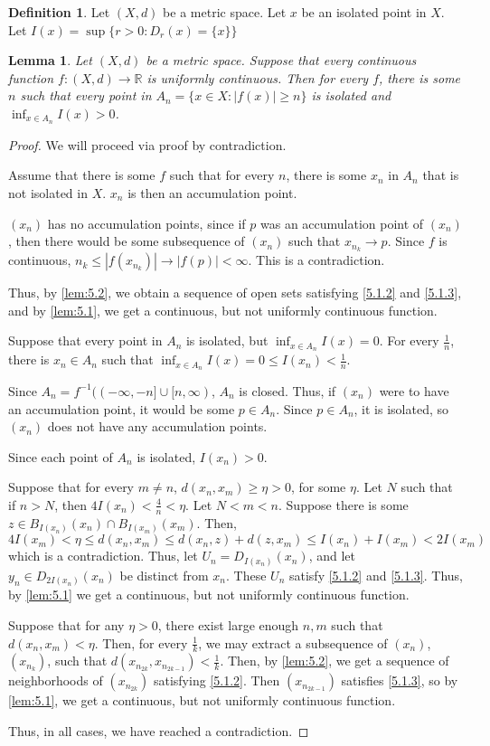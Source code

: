 \documentclass[openany, amssymb, psamsfonts]{amsart}
\let\fullref\autoref
\newtheorem{lem}{Lemma}[section]
\theoremstyle{definition}
\newtheorem{defn}{Definition}[section]
\numberwithin{equation}{section}
\begin{document}
\begin{defn}
  Let $(X,d)$ be a metric space. Let $x$ be an isolated point in $X$. Let $I(x) = \sup \{ r > 0 : D_r(x) = \{x\}\}$
\end{defn}
\begin{lem}\label{lem:5.3}
  Let $(X,d)$ be a metric space. Suppose that every continuous function $f:(X,d) \to \mathbb R$ is uniformly continuous. Then for every $f$, there is some $n$ such that every point in $A_n = \{x \in X : |f(x)| \ge n\}$ is isolated and $\inf_{x\in A_n} I(x) > 0$. 
\end{lem}
\begin{proof}
We will proceed via proof by contradiction.

Assume that there is some $f$ such that for every $n$, there is some $x_n$ in $A_n$ that is not isolated in $X$. $x_n$ is then an accumulation point. 

$(x_n)$ has no accumulation points, since if $p$ was an accumulation point of $(x_n)$, then there would be some subsequence of $(x_n)$ such that $x_{n_k} \to p$. Since $f$ is continuous, $n_k \le |f(x_{n_k})| \to |f(p)| < \infty$. This is a contradiction. 

Thus, by \fullref{lem:5.2}, we obtain a sequence of open sets satisfying \ref{5.1.2} and \ref{5.1.3}, and by \fullref{lem:5.1}, we get a continuous, but not uniformly continuous function.

Suppose that every point in $A_n$ is isolated, but $\inf_{x\in A_n} I(x) = 0$. For every $\frac1{n}$, there is $x_n \in A_n$ such that $\inf_{x\in A_n} I(x) = 0 \le I(x_n) < \frac1{n}$. 

Since $A_n = f^{-1}((-\infty, -n] \cup [n, \infty)$, $A_n$ is closed. Thus, if $(x_n)$ were to have an accumulation point, it would be some $p \in A_n$. Since $p\in A_n$, it is isolated, so $(x_n)$ does not have any accumulation points. 

Since each point of $A_n$ is isolated, $I(x_n) > 0$. 

Suppose that for every $m\neq n$, $d(x_n, x_m) \ge \eta > 0$, for some $\eta$. Let $N$ such that if $n > N$, then $4 I(x_n) < \frac4{n} < \eta$. Let $N < m < n$. Suppose there is some $z \in B_{I(x_n)}(x_n) \cap B_{I(x_m)}(x_m)$. Then,
\[
  4I(x_m) < \eta \le d(x_n, x_m) \le d(x_n, z) + d(z, x_m) \le I(x_n) + I(x_m) < 2I(x_m)
\]
which is a contradiction. Thus, let $U_n = D_{I(x_n)}(x_n)$, and let $y_n \in D_{2I(x_n)}(x_n)$ be distinct from $x_n$. These $U_n$ satisfy \ref{5.1.2} and \ref{5.1.3}. Thus, by \fullref{lem:5.1} we get a continuous, but not uniformly continuous function.

Suppose that for any $\eta > 0$, there exist large enough $n,m$ such that $d(x_n, x_m) < \eta$. Then, for every $\frac1{k}$, we may extract a subsequence of $(x_n)$, $(x_{n_k})$, such that $d(x_{n_{2k}}, x_{n_{2k-1}}) < \frac1{k}$. Then, by \fullref{lem:5.2}, we get a sequence of neighborhoods of $(x_{n_{2k}})$ satisfying \ref{5.1.2}. Then $(x_{n_{2k-1}})$ satisfies \ref{5.1.3}, so by \fullref{lem:5.1}, we get a continuous, but not uniformly continuous function. 

Thus, in all cases, we  have reached a contradiction.
\end{proof}
\end{document}
